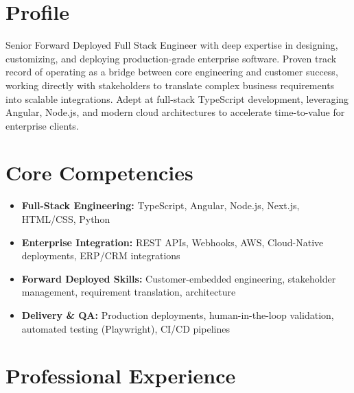 \documentclass[11pt,a4paper,sans]{moderncv}
\begin{document}
\makecvtitle

\section{Profile}
Senior Forward Deployed Full Stack Engineer with deep expertise in designing, customizing, and deploying production-grade enterprise software. Proven track record of operating as a bridge between core engineering and customer success, working directly with stakeholders to translate complex business requirements into scalable integrations. Adept at full-stack TypeScript development, leveraging Angular, Node.js, and modern cloud architectures to accelerate time-to-value for enterprise clients.

\section{Core Competencies}
\begin{itemize}
\item \textbf{Full-Stack Engineering:} TypeScript, Angular, Node.js, Next.js, HTML/CSS, Python
\item \textbf{Enterprise Integration:} REST APIs, Webhooks, AWS, Cloud-Native deployments, ERP/CRM integrations
\item \textbf{Forward Deployed Skills:} Customer-embedded engineering, stakeholder management, requirement translation, architecture
\item \textbf{Delivery \& QA:} Production deployments, human-in-the-loop validation, automated testing (Playwright), CI/CD pipelines
\end{itemize}

\section{Professional Experience}

\end{document}
